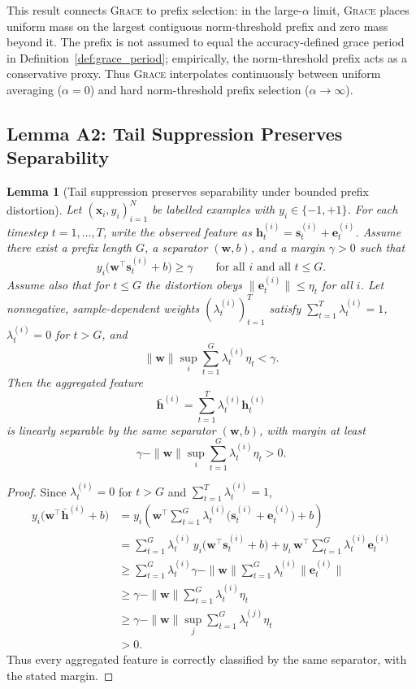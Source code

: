 \documentclass{article}
\newtheorem{lemma}[theorem]{Lemma}
\theoremstyle{remark}
\newcommand{\bx}{\mathbf{x}}
\newcommand{\grace}{\textnormal{\textsc{Grace}}}
\begin{document}
This result connects \grace{} to prefix selection: in the large-$\alpha$
limit, \grace{} places uniform mass on the largest contiguous
norm-threshold prefix and zero mass beyond it. The prefix is not assumed to
equal the accuracy-defined grace period in Definition~\ref{def:grace_period};
empirically, the norm-threshold prefix acts as a conservative proxy. Thus
\grace{} interpolates continuously between uniform averaging ($\alpha = 0$)
and hard norm-threshold prefix selection ($\alpha \to \infty$).

\subsection{Lemma A2: Tail Suppression Preserves Separability}
\label{app:lemma:tail}

\begin{lemma}[Tail suppression preserves separability under bounded prefix distortion]
\label{lemma:tail}
Let $(\bx_i,y_i)_{i=1}^N$ be labelled examples with $y_i \in \{-1,+1\}$.
For each timestep $t = 1,\ldots,T$, write the observed feature as
$\mathbf{h}_t^{(i)} = \mathbf{s}_t^{(i)} + \mathbf{e}_t^{(i)}$.
Assume there exist a prefix length $G$, a separator $(\mathbf{w}, b)$, and a
margin $\gamma > 0$ such that
\[
  y_i\bigl(\mathbf{w}^{\top}\mathbf{s}_t^{(i)} + b\bigr) \geq \gamma
  \qquad \text{for all } i \text{ and all } t \leq G.
\]
Assume also that for $t \leq G$ the distortion obeys
$\|\mathbf{e}_t^{(i)}\| \leq \eta_t$ for all $i$. Let nonnegative,
sample-dependent weights $(\lambda_t^{(i)})_{t=1}^T$ satisfy
$\sum_{t=1}^T \lambda_t^{(i)} = 1$, $\lambda_t^{(i)} = 0$ for $t > G$, and
\[
  \|\mathbf{w}\| \sup_i \sum_{t=1}^G \lambda_t^{(i)} \eta_t < \gamma.
\]
Then the aggregated feature
\[
  \bar{\mathbf{h}}^{(i)} = \sum_{t=1}^T \lambda_t^{(i)} \mathbf{h}_t^{(i)}
\]
is linearly separable by the same separator $(\mathbf{w}, b)$, with margin at
least
\[
  \gamma - \|\mathbf{w}\|\sup_i \sum_{t=1}^G \lambda_t^{(i)} \eta_t > 0.
\]
\end{lemma}

\begin{proof}
Since $\lambda_t^{(i)} = 0$ for $t > G$ and
$\sum_{t=1}^T \lambda_t^{(i)} = 1$,
\begin{align*}
  y_i\bigl(\mathbf{w}^{\top}\bar{\mathbf{h}}^{(i)} + b\bigr)
  &= y_i\left(
  \mathbf{w}^{\top}\sum_{t=1}^G \lambda_t^{(i)}
  \bigl(\mathbf{s}_t^{(i)} + \mathbf{e}_t^{(i)}\bigr) + b
  \right) \\
  &= \sum_{t=1}^G \lambda_t^{(i)}\,
  y_i\bigl(\mathbf{w}^{\top}\mathbf{s}_t^{(i)} + b\bigr)
  + y_i\,\mathbf{w}^{\top}\sum_{t=1}^G \lambda_t^{(i)} \mathbf{e}_t^{(i)} \\
  &\geq \sum_{t=1}^G \lambda_t^{(i)} \gamma
  - \|\mathbf{w}\| \sum_{t=1}^G \lambda_t^{(i)} \|\mathbf{e}_t^{(i)}\| \\
  &\geq \gamma - \|\mathbf{w}\| \sum_{t=1}^G \lambda_t^{(i)} \eta_t \\
  &\geq \gamma - \|\mathbf{w}\|\sup_j \sum_{t=1}^G \lambda_t^{(j)} \eta_t \\
  &> 0.
\end{align*}
Thus every aggregated feature is correctly classified by the same separator,
with the stated margin.
\end{proof}
\end{document}
